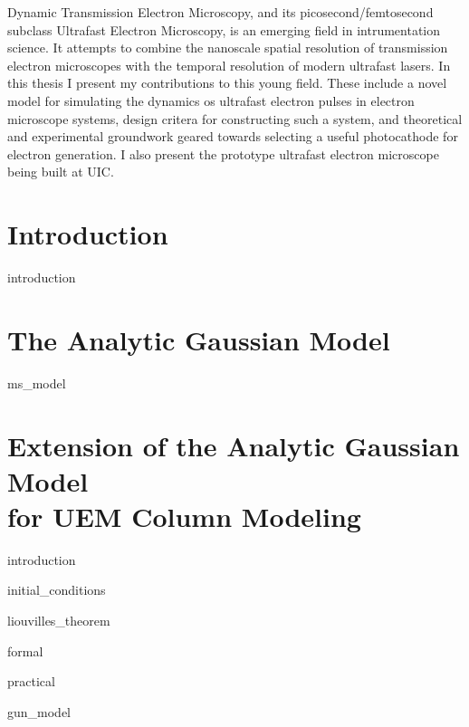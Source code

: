 \documentclass{uicthesi}
\begin{document}
 
 
\tableofcontents
\listoffigures
 

 
\summary
Dynamic Transmission Electron Microscopy, and its picosecond/femtosecond subclass Ultrafast Electron Microscopy, is an emerging field in intrumentation science.
It attempts to combine the nanoscale spatial resolution of transmission electron microscopes with the temporal resolution of modern ultrafast lasers.
In this thesis I present my contributions to this young field. 
These include a novel model for simulating the dynamics os ultrafast electron pulses in electron microscope systems,
design critera for constructing such a system, and theoretical and experimental groundwork geared towards selecting a useful photocathode for electron generation.
I also present the prototype ultrafast electron microscope being built at UIC.

\chapter{Introduction}

  {introduction}

\chapter{The Analytic Gaussian Model} \label{chap:ms_model}

  {ms_model}

\chapter{Extension of the Analytic Gaussian Model\\for UEM Column Modeling} \label{chap:extension}

  {introduction}

  {initial_conditions}

  {liouvilles_theorem}

  {formal}

  {practical}

  {gun_model}
\end{document}
